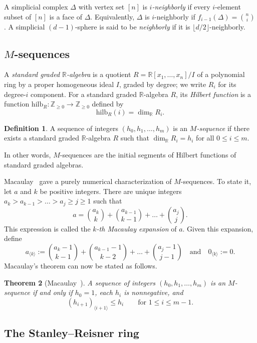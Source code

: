 \documentclass[11pt]{article}
\newtheorem{theorem}{Theorem}[section]
\theoremstyle{definition}
\newtheorem{definition}[theorem]{Definition}
\numberwithin{equation}{theorem}
\newcommand{\kk}{{\mathbb R}}
\begin{document}
A simplicial complex $\Delta$ with vertex set $[n]$ is \emph{$i$-neighborly} if every $i$-element subset of $[n]$ is a face of $\Delta$. Equivalently, $\Delta$ is $i$-neighborly if $f_{i-1}(\Delta)=\binom{n}{i}$. A simplicial $(d-1)$-sphere is said to be \emph{neighborly} if it is $\lfloor d/2\rfloor$-neighborly.


\subsection{$M$-sequences}

A \emph{standard graded $\kk$-algebra} is a quotient $R = \kk[x_1,\dots,x_n]/I$ of a polynomial ring by a proper homogeneous ideal $I$, graded by degree; we write $R_i$ for its degree-$i$ component.
For a standard graded $\kk$-algebra $R$, its \emph{Hilbert function} is a function $\mathrm{hilb}_R:\mathbb Z_{\geq 0} \to \mathbb Z_{\ge 0}$ defined by
\[
\mathrm{hilb}_R(i)= \dim_\kk R_i.
\]

\begin{definition}
A sequence of integers $(h_0, h_1, \dots, h_m)$ is an \emph{$M$-sequence} if there exists a standard graded $\kk$-algebra $R$ such that $\dim_{\kk} R_i = h_i$ for all $0 \le i \le m$.
\end{definition}

\noindent In other words, $M$-sequences are the initial segments of Hilbert functions of standard graded algebras.

Macaulay~\cite{Macaulay1927} gave a purely numerical characterization of $M$-sequences. To state it, let $a$ and $k$ be positive integers. There are unique integers $a_k > a_{k-1} > \dots > a_j \ge j \ge 1$ such that
\[
  a = \binom{a_k}{k} + \binom{a_{k-1}}{k-1} + \dots + \binom{a_j}{j}.
\]
This expression is called the \emph{$k$-th Macaulay expansion} of $a$. Given this expansion, define
\[
  a_{\langle k\rangle} := \binom{a_k-1}{k-1} + \binom{a_{k-1}-1}{k-2}
  + \dots + \binom{a_j-1}{j-1}
  \quad\text{and}\quad 0_{\langle k\rangle} := 0.
\]
Macaulay's theorem can now be stated as follows.

\begin{theorem}[Macaulay~\cite{Macaulay1927}]
\label{thm:Macaulay}
A sequence of integers $(h_0, h_1, \dots, h_m)$ is an $M$-sequence if and only if $h_0 = 1$, each $h_i$ is nonnegative, and
\[
  (h_{i+1})_{\langle i+1\rangle} \le h_i \qquad \text{for } 1 \le i \le m-1.
\]
\end{theorem}


\subsection{The Stanley--Reisner ring}\label{subsec:face-ring}
\end{document}
